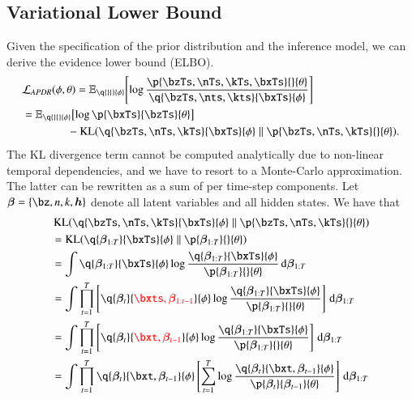 \subsection{Variational Lower Bound}
Given the specification of the prior distribution and the inference model, we can derive the evidence lower bound (ELBO).
\begin{equation}
\begin{aligned}
    &\loss[APDR]{\phi, \theta} = \expc{ \log \frac{ \p{\bzTs, \nTs, \kTs, \bxTs}{}{\theta} }{ \q{\bzTs, \nts, \kts}{\bxTs}{\phi} } }{}{ \q{}{}{\phi} }\\
    &= \expc{ \log \p{\bxTs}{\bzTs}{\theta} }{}{ \q{}{}{\phi} } \\
%    
    &\qquad \qquad - \kl{\q{\bzTs, \nTs, \kTs}{\bxTs}{\phi}}{\p{\bzTs, \nTs, \kTs}{}{\theta}}.
\end{aligned}
\end{equation}
The KL divergence term cannot be computed analytically due to non-linear temporal dependencies, and we have to resort to a Monte-Carlo approximation. The latter can be rewritten as a sum of per time-step components. 
Let $\bm{\beta} = \{ \bz, n, k, \bm{h} \}$ denote all latent variables and all hidden states. We have that 
\begin{equation}
\begin{aligned}
    &\kl{\q{\bzTs, \nTs, \kTs}{\bxTs}{\phi}}{\p{\bzTs, \nTs, \kTs}{}{\theta}}\\
    &= \kl{\q{\bm{\beta}_{1:T}}{\bxTs}{\phi}}{\p{\bm{\beta}_{1:T}}{}{\theta}}\\
    &= \int \q{\bm{\beta}_{1:T}}{\bxTs}{\phi} \log{\frac{\q{\bm{\beta}_{1:T}}{\bxTs}{\phi}}{\p{\bm{\beta}_{1:T}}{}{\theta}}} \dint \bm{\beta}_{1:T}\\
    &= \int \prod_{t=1}^T \left[ \q{\bm{\beta}_t}{\textcolor{red}{\bxts, \bm{\beta}_{1:t-1}}}{\phi} \log{\frac{\q{\bm{\beta}_{1:T}}{\bxTs}{\phi}}{\p{\bm{\beta}_{1:T}}{}{\theta}}} \right] \dint \bm{\beta}_{1:T}\\
    &= \int \prod_{t=1}^T \left[ \q{\bm{\beta}_t}{\textcolor{red}{\bxt, \bm{\beta}_{t-1}}}{\phi} \log{\frac{\q{\bm{\beta}_{1:T}}{\bxTs}{\phi}}{\p{\bm{\beta}_{1:T}}{}{\theta}}} \right] \dint \bm{\beta}_{1:T}\\
%    
    &= \int \prod_{t=1}^T \q{\bm{\beta}_t}{\bxt, \bm{\beta}_{t-1}}{\phi} \left[ \sum_{t=1}^{T} \log{\frac{ \q{\bm{\beta}_t}{\bxt, \bm{\beta}_{t-1}}{\phi} }{ \p{\bm{\beta}_t}{\bm{\beta}_{t-1} }{\theta}}} \right]  \dint \bm{\beta}_{1:T}
\end{aligned}
\end{equation}
